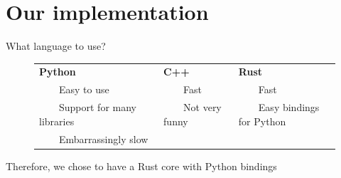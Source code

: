 \documentclass[aspectratio=169,draft]{beamer}
\newcommand{\tabitem}{~~\llap{\textbullet}~~}
\begin{document}
\section{Our implementation}
\begin{frame}{What language to use?}
    \begin{figure}
        \centering
        \renewcommand{\arraystretch}{1.4}
        \begin{tabular}{p{5cm}p{3.5cm}p{4.5cm}}
            \centering\textbf{Python}           & \centering\textbf{C++}  & \hspace{1.6cm}\textbf{Rust}       \\
            \tabitem Easy to use                & \tabitem Fast           & \tabitem Fast                     \\
            \tabitem Support for many libraries & \tabitem Not very funny & \tabitem Easy bindings for Python \\
            \tabitem Embarrassingly slow        &                         &
        \end{tabular}
    \end{figure}
    \vspace*{1cm}
    \centering
    Therefore, we chose to have a Rust core with Python bindings
\end{frame}
\end{document}
